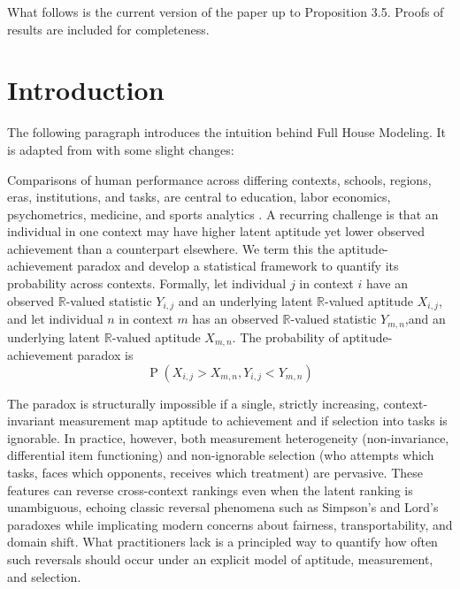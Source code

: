 \documentclass[12pt]{article}
\newcommand{\R}{\mathbb{R}}
\DeclareMathOperator*{\Prob}{P}
\begin{document}
What follows is the current version of the paper up to Proposition 3.5. Proofs of results are included for completeness.

\section*{Introduction}

The following paragraph introduces the intuition behind Full House Modeling. It is adapted from \cite{yan2025comparing} with some slight changes: 

\vspace{12pt}

Comparisons of human performance across differing contexts, schools, regions, eras, institutions, and tasks, are central to education, labor economics, psychometrics, medicine, and sports analytics \citep{chetty2014measuring, iezzoni1997risk, bartholomew2011latent, bond2013applying, BRL99, imbens2018causal, holland2012differential, yan2025comparing}. A recurring challenge is that an individual in one context may have higher latent aptitude yet lower observed achievement than a counterpart elsewhere. We term this the aptitude-achievement paradox and develop a statistical framework to quantify its probability across contexts. Formally, let individual $j$ in context $i$ have an observed $\R$-valued statistic $Y_{i,j}$ and an underlying latent $\R$-valued aptitude $X_{i,j}$, and let individual $n$ in context $m$ has an observed $\R$-valued statistic $Y_{m,n}$,and an underlying latent $\R$-valued aptitude $X_{m,n}$. The probability of aptitude-achievement paradox is 
$$
\Prob\left(X_{i,j} > X_{m,n}, Y_{i,j} < Y_{m,n}\right)
$$

The paradox is structurally impossible if a single, strictly increasing, context-invariant measurement map aptitude to achievement and if selection into tasks is ignorable. In practice, however, both measurement heterogeneity (non-invariance, differential item functioning) and non-ignorable selection (who attempts which tasks, faces which opponents, receives which treatment) are pervasive. These features can reverse cross-context rankings even when the latent ranking is unambiguous, echoing classic reversal phenomena such as Simpson's \citep{simpson1951interpretation} and Lord's paradoxes \citep{lord1967paradox} while implicating modern concerns about fairness, transportability, and domain shift. What practitioners lack is a principled way to quantify how often such reversals should occur under an explicit model of aptitude, measurement, and selection.
\end{document}
